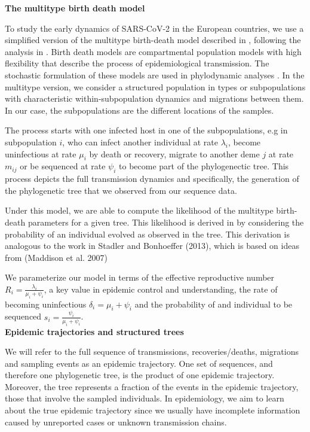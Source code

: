\textbf{The multitype birth death model}

To study the early dynamics of SARS-CoV-2 in the European countries, we use a simplified version of the multitype birth-death model described in \cite{Kuhnert2016}, following the analysis in \cite{Nadeau2020}. Birth death models are compartmental population models with high flexibility that describe the process of epidemiological transmission. The stochastic formulation of these models are used in phylodynamic analyses \cite{Stadler2012}. In the multitype version, we consider a structured population in types or subpopulations with characteristic within-subpopulation dynamics and migrations between them. In our case, the subpopulations are the different locations of the samples.

The process starts with one infected host in one of the subpopulations, e.g in subpopulation $i$, who can infect another individual at rate $\lambda_i$, become uninfectious at rate $\mu_i$ by death or recovery, migrate to another deme $j$ at rate $m_{ij}$ or be sequenced at rate $\psi_i$ to become part of the phylogenectic tree. This process depicts the full transmission dynamics and specifically, the generation of the phylogenetic tree that we observed from our sequence data. 

Under this model, we are able to compute the likelihood of the multitype birth-death parameters for a given tree. This likelihood is derived in \cite{Kuhnert} by considering the probability of an individual evolved as observed in the tree. This derivation is analogous to the work in Stadler and Bonhoeffer (2013), which is based on ideas from (Maddison et al. 2007)

We parameterize our model in terms of the effective reproductive number $R_i = \frac{\lambda_i}{\mu_i + \psi_i}$, a key value in epidemic control and understanding, the rate of becoming uninfectious $\delta_i = \mu_i + \psi_i$ and the probability of and individual to be sequenced $s_i = \frac{\psi_i}{\mu_i + \psi_i}$.\\

\textbf{Epidemic trajectories and structured trees}

We will refer to the full sequence of transmissions, recoveries/deaths, migrations and sampling events as an epidemic trajectory. One set of sequences, and therefore one phylogenetic tree, is the product of one epidemic trajectory. Moreover, the tree represents a fraction of the events in the epidemic trajectory, those that involve the sampled individuals. In epidemiology, we aim to learn about the true epidemic trajectory since we usually have incomplete information caused by unreported cases or unknown transmission chains.


